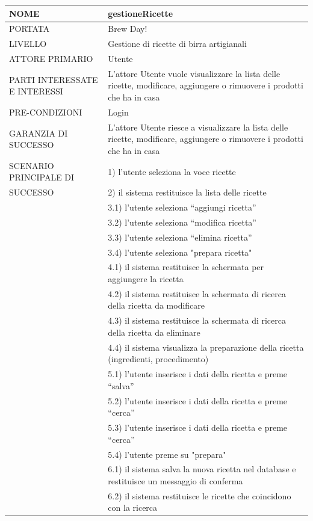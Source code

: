 \documentclass[a4paper, titlepage]{article}
\begin{document}
\begin{longtable}{p{6cm}p{7cm}}\toprule
    NOME & gestioneRicette\\\midrule
    PORTATA & Brew Day!\\\midrule
    LIVELLO & Gestione di ricette di birra artigianali\\\midrule
    ATTORE PRIMARIO & Utente\\\midrule
    PARTI INTERESSATE E INTERESSI &
    L’attore Utente vuole visualizzare la lista delle ricette, modificare, aggiungere o rimuovere i prodotti che ha in casa \\\midrule
    PRE-CONDIZIONI & Login\\\midrule
    GARANZIA DI SUCCESSO & L’attore Utente riesce a visualizzare la lista delle ricette, modificare, aggiungere o rimuovere i prodotti che ha in casa \\\midrule
    SCENARIO PRINCIPALE DI
    & 1) l’utente seleziona la voce ricette\\
    SUCCESSO & 2) il sistema restituisce la lista delle ricette\\
    & 3.1) l’utente seleziona “aggiungi ricetta”\\
    & 3.2) l’utente seleziona “modifica ricetta”\\
    & 3.3) l’utente seleziona “elimina ricetta”\\
    & 3.4) l'utente seleziona "prepara ricetta"\\
    & 4.1) il sistema restituisce la schermata per aggiungere la ricetta\\
    & 4.2) il sistema restituisce la schermata di ricerca della ricetta da modificare\\
    & 4.3) il sistema restituisce la schermata di ricerca della ricetta da eliminare\\
    & 4.4) il sistema visualizza la preparazione della ricetta (ingredienti, procedimento)\\
    & 5.1) l’utente inserisce i dati della ricetta e preme “salva”\\
    & 5.2) l’utente inserisce i dati della ricetta e preme “cerca”\\
    & 5.3) l’utente inserisce i dati della ricetta e preme “cerca”\\
    & 5.4) l'utente preme su "prepara"\\
    & 6.1) il sistema salva la nuova ricetta nel database e restituisce un messaggio di conferma\\
    & 6.2) il sistema restituisce le ricette che coincidono con la ricerca\\

\end{longtable}
\end{document}
